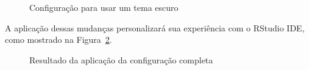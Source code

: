 \documentclass[
  letterpaper,
]{book}
\theoremstyle{definition}
\theoremstyle{plain}
\theoremstyle{remark}
\begin{document}
\begin{figure}


\caption{\label{fig-font-size-dark-theme}Configuração para usar um tema
escuro}

\end{figure}%

A aplicação dessas mudanças personalizará sua experiência com o RStudio
IDE, como mostrado na Figura~\ref{fig-customize-rstudio-ide}.

\begin{figure}


\caption{\label{fig-customize-rstudio-ide}Resultado da aplicação da
configuração completa}

\end{figure}%
\end{document}
